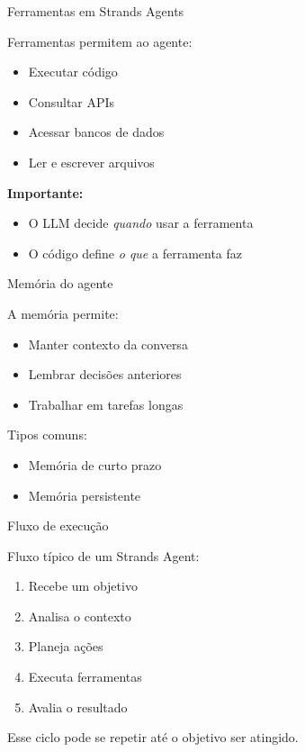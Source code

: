 \documentclass{beamer}
\begin{document}
\begin{frame}{Ferramentas em Strands Agents}
    
    Ferramentas permitem ao agente:
    \begin{itemize}
        \item Executar código
        \item Consultar APIs
        \item Acessar bancos de dados
        \item Ler e escrever arquivos
    \end{itemize}
    
    \vspace{0.3cm}
    
    \textbf{Importante:}
    \begin{itemize}
        \item O LLM decide \textit{quando} usar a ferramenta
        \item O código define \textit{o que} a ferramenta faz
    \end{itemize}
    
\end{frame}

\begin{frame}{Memória do agente}
    
    A memória permite:
    \begin{itemize}
        \item Manter contexto da conversa
        \item Lembrar decisões anteriores
        \item Trabalhar em tarefas longas
    \end{itemize}
    
    \vspace{0.3cm}
    
    Tipos comuns:
    \begin{itemize}
        \item Memória de curto prazo
        \item Memória persistente
    \end{itemize}
    
\end{frame}

\begin{frame}{Fluxo de execução}
    
    Fluxo típico de um Strands Agent:
    \begin{enumerate}
        \item Recebe um objetivo
        \item Analisa o contexto
        \item Planeja ações
        \item Executa ferramentas
        \item Avalia o resultado
    \end{enumerate}
    
    \vspace{0.3cm}
    
    Esse ciclo pode se repetir até o objetivo ser atingido.
    
\end{frame}
\end{document}
